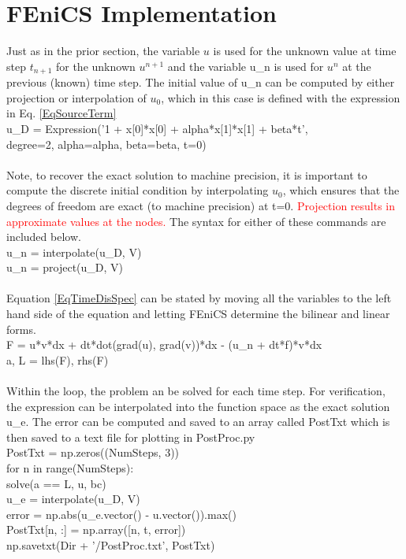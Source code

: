 \documentclass[12pt,3p]{article}
\begin{document}
\section{FEniCS Implementation}
\vspace{-2ex}
Just as in the prior section, the variable $u$ is used for the unknown value at time step $t_{n+1}$ for the unknown $u^{n+1}$ and the variable u\_n is used for $u^n$ at the previous (known) time step. The initial value of u\_n can be computed by either projection or interpolation of $u_0$, which in this case is defined with the expression in Eq. \ref{EqSourceTerm} \\
{\selectfont
u\_D = Expression('1 + x[0]*x[0] + alpha*x[1]*x[1] + beta*t',  \\
\indent \indent \indent \indent \indent \indent \indent degree=2, alpha=alpha, beta=beta, t=0) \\ \\
}
Note, to recover the exact solution to machine precision, it is important to compute the discrete initial condition by interpolating $u_0$, which ensures that the degrees of freedom are exact (to machine precision) at t=0. \textcolor{red}{Projection results in approximate values at the nodes.} The syntax for either of these commands are included below. \\
{\selectfont
u\_n = interpolate(u\_D, V) \\
u\_n = project(u\_D, V) \\ \\
}
Equation \ref{EqTimeDisSpec} can be stated by moving all the variables to the left hand side of the equation and letting FEniCS determine the bilinear and linear forms. \\
{\selectfont
F = u*v*dx + dt*dot(grad(u), grad(v))*dx - (u\_n + dt*f)*v*dx \\
a, L = lhs(F), rhs(F) \\ \\
}
Within the loop, the problem an be solved for each time step. For verification, the expression can be interpolated into the function space as the exact solution u\_e. The error can be computed and saved to an array called {\selectfont PostTxt} which is then saved to a text file for plotting in {\selectfont PostProc.py} \\
{\selectfont
PostTxt = np.zeros((NumSteps, 3)) \\
for n in range(NumSteps): \\
\indent     solve(a == L, u, bc) \\
\indent  u\_e = interpolate(u\_D, V) \\
\indent  error = np.abs(u\_e.vector() - u.vector()).max() \\
\indent PostTxt[n, :] = np.array([n, t, error]) \\
\indent np.savetxt(Dir + '/PostProc.txt', PostTxt) \\ \\
}
\end{document}
